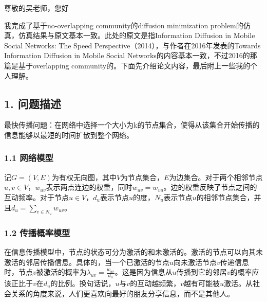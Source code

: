 \documentclass[UTF8]{ctexart}
\begin{document}
\par 尊敬的吴老师，您好
\newline 
\par
我完成了基于no-overlapping community的diffusion minimization problem的仿真，仿真结果与原文基本一致。此处的原文是指Information Diffusion in Mobile Social Networks:
The Speed Perspective（2014），与作者在2016年发表的Towards Information Diffusion in Mobile Social Networks的内容基本一致，不过2016的那篇是基于overlapping community的。下面先介绍论文内容，最后附上一些我的个人理解。
\subsection*{1. 问题描述}
最快传播问题：在网络中选择一个大小为k的节点集合，使得从该集合开始传播的信息能够以最短的时间扩散到整个网络。
\subsubsection*{1.1 网络模型}
\par 记$G=(V,E)$为有权无向图，其中$V$为节点集合，$E$为边集合。对于两个相邻节点$u,v \in V$，$w_{uv}$表示两点连边的权重，同时$w_{uv}=w_{vu}$。边的权重反映了节点之间的互动频率。对于节点$u \in V$，$d_u$表示节点$u$的度，$N_u$表示节点$u$的相邻节点集合，并且$d_u = \sum_{v \in N_{u}} w_{uv}$。
\subsubsection*{1.2 传播概率模型}
\par 在信息传播模型中，节点的状态可分为激活的和未激活的。激活的节点可以向其未激活的邻居传播信息。具体的，当一个已激活的节点$u$向未激活节点$v$传递信息时，节点$v$被激活的概率为$\lambda_{uv}=\frac {w_{uv}}{d_u}$。这是因为信息从$u$传播到它的邻居$v$的概率应该正比于$v$在$d_u$的比例。换句话说，$u$与$v$的互动越频繁，$v$越有可能被$u$激活。从社会关系的角度来说，人们更喜欢向最好的朋友分享信息，而不是其他人。
\end{document}
